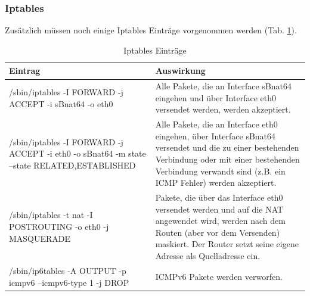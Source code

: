 \subsubsection*{Iptables}
Zusätzlich müssen noch einige Iptables Einträge vorgenommen werden (Tab. \ref{tab:IptablesEintraege}).
\begin{table}
	\centering
		\begin{tabular}{p{6cm}p{9cm}}
			Eintrag & Auswirkung \\ \hline
			/sbin/iptables -I FORWARD -j ACCEPT -i sBnat64 -o eth0 & Alle Pakete, die an Interface sBnat64 eingehen und über Interface eth0 versendet werden, werden akzeptiert. \\ \hline
			/sbin/iptables -I FORWARD -j ACCEPT -i eth0 -o sBnat64 -m state --state RELATED,ESTABLISHED & Alle Pakete, die an Interface eth0 eingehen, über Interface sBnat64 versendet und die zu einer bestehenden Verbindung oder mit einer bestehenden Verbindung verwandt sind (z.B. ein ICMP Fehler) werden akzeptiert. \\ \hline
			/sbin/iptables -t nat -I POSTROUTING -o eth0 -j MASQUERADE & Pakete, die über das Interface eth0 versendet werden und auf die NAT angewendet wird, werden nach dem Routen (aber vor dem Versenden) maskiert. Der Router setzt seine eigene Adresse als Quelladresse ein. \\ \hline
			/sbin/ip6tables -A OUTPUT -p icmpv6 --icmpv6-type 1 -j DROP & ICMPv6 Pakete werden verworfen. \\
		\end{tabular}
	\caption{Iptables Einträge}
	\label{tab:IptablesEintraege}
\end{table}

